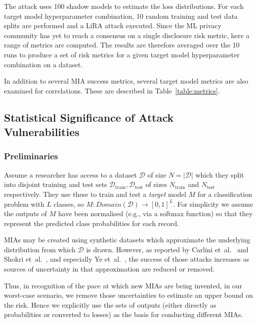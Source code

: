The attack uses 100 shadow models to estimate the loss distributions. For each target model hyperparameter combination, 10 random training and test data splits are performed and a LiRA attack executed. Since the ML privacy community has yet to reach a consensus on a single disclosure risk metric, here a range of metrics are computed. The results are therefore averaged over the 10 runs to produce a set of risk metrics for a given target model hyperparameter combination on a dataset.

In addition to several MIA success metrics, several target model metrics are also examined for correlations. These are described in Table~\ref{table:metrics}.



\subsection{Statistical Significance of Attack Vulnerabilities}%
\label{sec:tpr_ssd}

\subsubsection{Preliminaries}

Assume a researcher has access to a dataset $\mathcal{D}$ of size $N=|\mathcal{D}|$ which they split into disjoint training and test sets $\mathcal{D}_{\text{train}}, \mathcal{D}_{\text{test}}$ of sizes $N_{\text{train}}$ and $N_{\text{test}}$ respectively. They use these to train and test a \textit{target} model $M$ for a classification problem with $L$ classes, so $M: Domain(\mathcal{D}) \rightarrow [0,1]^L$. For simplicity we assume the outputs of $M$ have been normalised (e.g., via a softmax function) so that they represent the predicted class probabilities for each record. 

MIAs may be created using synthetic datasets which approximate the underlying distribution from which $\mathcal{D}$ is drawn. However, as reported by Carlini et~al.~\cite{Carlini:2022} and Shokri et~al.~\cite{Shokri:2017}, and especially Ye et~al.~\cite{Ye:2022}, the success of those attacks increases as sources of uncertainty in that approximation are reduced or removed.

Thus, in recognition of the pace at which new MIAs are being invented, in our worst-case scenario, we remove those uncertainties to estimate an upper bound on the risk. Hence we explicitly use the sets of outputs (either directly as probabilities or converted to losses) as the basis for conducting different MIAs.

